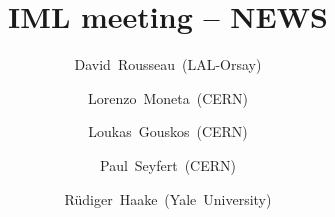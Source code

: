 \author[]{David~Rousseau~(LAL-Orsay)\and
Lorenzo~Moneta~(CERN)\and
Loukas~Gouskos~(CERN)\and
Paul~Seyfert~(CERN)\and
Rüdiger~Haake~(Yale~University)\and
}
\institute[CERN]{}
\date[\today]{}
\title{IML meeting -- NEWS}
\newcommand{\gitlablink}{\myhref{https://gitlab.cern.ch/pseyfert/slides-imlnews-2019-10-09}{https://gitlab.cern.ch/pseyfert/slides-imlnews-2019-10-09}}
